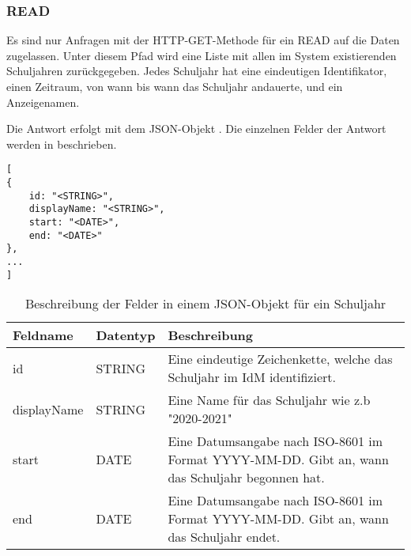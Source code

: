 \subsubsection{READ}
\label{sec:rest:api:schools-periods:read}
Es sind nur Anfragen mit der HTTP-GET-Methode für ein READ auf die Daten zugelassen.
Unter diesem Pfad wird eine Liste mit allen im System existierenden Schuljahren zurückgegeben.
Jedes Schuljahr hat eine eindeutigen Identifikator, einen Zeitraum, von wann bis wann das Schuljahr andauerte, und ein Anzeigenamen.

Die Antwort erfolgt mit dem JSON-Objekt . 
Die einzelnen Felder der Antwort werden in  beschrieben.

\begin{lstlisting}[caption={JSON-Antwort für einen GET-Aufruf des Pfads /api/school-periods},label={lst:code:rest:api:schools-periods:read:ret},frame=tlrb]
[
{
    id: "<STRING>",
    displayName: "<STRING>",
    start: "<DATE>",
    end: "<DATE>"
},
...
]
\end{lstlisting}

\begin{longtable}{|p{}|p{}|p{}|}
		\caption{Beschreibung der Felder in einem JSON-Objekt für ein Schuljahr}
\endfoot
		\caption{Beschreibung der Felder in einem JSON-Objekt für ein Schuljahr}
		\label{tab:rest:api:schools-periods:read:ret:json}
\endlastfoot 
\hline
			\textbf{Feldname} & \textbf{Datentyp} & \textbf{Beschreibung} \\ \hline
\endhead
 id & STRING & Eine eindeutige Zeichenkette, welche das Schuljahr im IdM identifiziert. \\ \hline
 displayName & STRING & Eine Name für das Schuljahr wie z.b "2020-2021" \\ \hline
 start & DATE & Eine Datumsangabe nach ISO-8601 im Format YYYY-MM-DD. Gibt an, wann das Schuljahr begonnen hat. \\ \hline
 end & DATE & Eine Datumsangabe nach ISO-8601 im Format YYYY-MM-DD. Gibt an, wann das Schuljahr endet. \\ \hline
\end{longtable}
